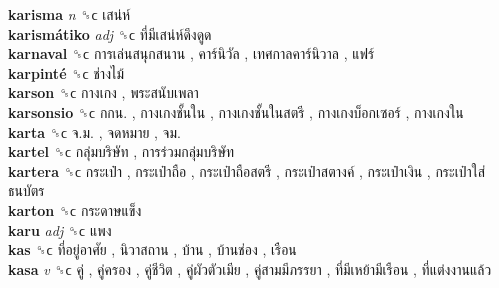 \textbf{karisma} \emph{n}  ␝ϲ   เสน่ห์   \\
\textbf{karismátiko} \emph{adj}  ␝ϲ   ที่มีเสน่ห์ดึงดูด   \\
\textbf{karnaval} ␝ϲ   การเล่นสนุกสนาน ,  คาร์นิวัล ,  เทศกาลคาร์นิวาล ,  แฟร์   \\
\textbf{karpinté} ␝ϲ   ช่างไม้   \\
\textbf{karson} ␝ϲ   กางเกง ,  พระสนับเพลา   \\
\textbf{karsonsio} ␝ϲ   กกน. ,  กางเกงชั้นใน ,  กางเกงชั้นในสตรี ,  กางเกงบ็อกเซอร์ ,  กางเกงใน   \\
\textbf{karta} ␝ϲ   จ.ม. ,  จดหมาย ,  จม.   \\
\textbf{kartel} ␝ϲ   กลุ่มบริษัท ,  การร่วมกลุ่มบริษัท   \\
\textbf{kartera} ␝ϲ   กระเป๋า ,  กระเป๋าถือ ,  กระเป๋าถือสตรี ,  กระเป๋าสตางค์ ,  กระเป๋าเงิน ,  กระเป๋าใส่ธนบัตร   \\
\textbf{karton} ␝ϲ   กระดาษแข็ง   \\
\textbf{karu} \emph{adj}  ␝ϲ   แพง   \\
\textbf{kas} ␝ϲ   ที่อยู่อาศัย ,  นิวาสถาน ,  บ้าน ,  บ้านช่อง ,  เรือน   \\
\textbf{kasa} \emph{v}  ␝ϲ   คู่ ,  คู่ครอง ,  คู่ชีวิต ,  คู่ผัวตัวเมีย ,  คู่สามมีภรรยา ,  ที่มีเหย้ามีเรือน ,  ที่แต่งงานแล้ว   \\
